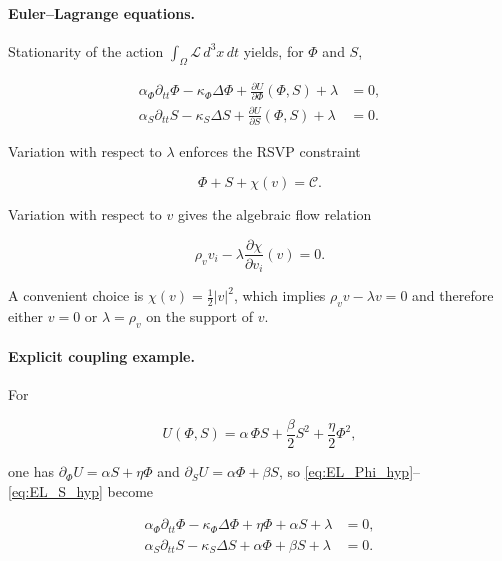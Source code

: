 \documentclass[12pt,a4paper]{article}
\theoremstyle{definition}
\begin{document}
\paragraph{Euler--Lagrange equations.}
Stationarity of the action $\int_\Omega \mathcal{L}\,d^3x\,dt$ yields, for
$\Phi$ and $S$,

\begin{align}
  \alpha_\Phi \partial_{tt}\Phi
  - \kappa_\Phi \Delta \Phi
  + \frac{\partial U}{\partial \Phi}(\Phi,S)
  + \lambda
  &= 0,
  \label{eq:EL_Phi_hyp}
  \\
  \alpha_S \partial_{tt}S
  - \kappa_S \Delta S
  + \frac{\partial U}{\partial S}(\Phi,S)
  + \lambda
  &= 0.
  \label{eq:EL_S_hyp}
\end{align}

Variation with respect to $\lambda$ enforces the RSVP constraint

\begin{equation}
  \Phi + S + \chi(v) = \mathcal{C}.
  \label{eq:constraint_RSVP_hyp}
\end{equation}

Variation with respect to $v$ gives the algebraic flow relation

\begin{equation}
  \rho_v v_i - \lambda \frac{\partial \chi}{\partial v_i}(v) = 0.
  \label{eq:EL_v_hyp}
\end{equation}

A convenient choice is $\chi(v)=\frac{1}{2}|v|^2$, which implies
$\rho_v v - \lambda v = 0$ and therefore either $v=0$ or $\lambda=\rho_v$
on the support of $v$.

\paragraph{Explicit coupling example.}
For

\begin{equation}
  U(\Phi,S)=\alpha\,\Phi S+\frac{\beta}{2}S^2+\frac{\eta}{2}\Phi^2,
  \label{eq:U_example}
\end{equation}

one has
$\partial_\Phi U = \alpha S+\eta \Phi$ and $\partial_S U = \alpha \Phi+\beta S$,
so \eqref{eq:EL_Phi_hyp}--\eqref{eq:EL_S_hyp} become

\begin{align}
  \alpha_\Phi \partial_{tt}\Phi
  - \kappa_\Phi \Delta \Phi
  + \eta \Phi + \alpha S
  + \lambda
  &= 0,
  \label{eq:Phi_hyp_linear}
  \\
  \alpha_S \partial_{tt}S
  - \kappa_S \Delta S
  + \alpha \Phi + \beta S
  + \lambda
  &= 0.
  \label{eq:S_hyp_linear}
\end{align}
\end{document}
